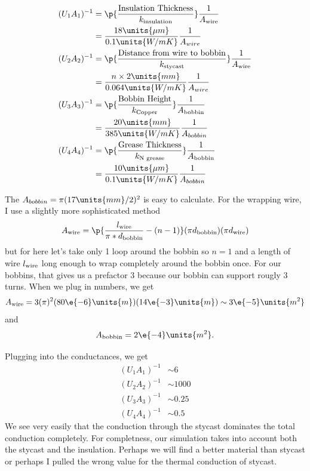 \documentclass[10pt,twocolumn,aps,rmp,tightenlines,reprint]{revtex4-1}
\begin{document}
\begin{align*}
    (U_1A_1)^{-1}
    &= \p{ \frac{\text{Insulation Thickness}}{k_{\text{insulation}}}} 
    \frac{1}{A_{\text{wire}}}\\
    &= \frac{18 \units{\mu m}}{0.1 \units{W/mK}} \frac{1}{A_{wire}}\\
    (U_2A_2)^{-1}
    &= \p{ \frac{\text{Distance from wire to bobbin}}{k_{\text{stycast}}}} 
    \frac{1}{A_{\text{wire}}}\\
    &= \frac{n \times 2 \units{mm}}{0.064 \units{W/mK}} \frac{1}{A_{wire}}\\
    (U_3A_3)^{-1}
    &= \p{ \frac{\text{Bobbin Height}}{k_{\text{Copper}}}} 
    \frac{1}{A_{\text{bobbin}}}\\
    &= \frac{20 \units{mm}}{385 \units{W/mK}} \frac{1}{A_{bobbin}}\\
    (U_4A_4)^{-1}
    &= \p{ \frac{\text{Grease Thickness}}{k_{\text{N grease}}}} 
    \frac{1}{A_{\text{bobbin}}}\\
    &= \frac{10 \units{\mu m}}{0.1 \units{W/mK}} \frac{1}{A_{bobbin}}
\end{align*}

The \(A_{bobbin} = \pi (17\units{mm}/2)^2\) is easy to calculate.  For the 
wrapping wire, I use a slightly more sophisticated method 
\[A_{\rm wire} = \p{\frac{l_{\rm wire}}{\pi * d_{\rm bobbin}} - (n-1)} 
(\pi d_{\rm bobbin}) (\pi d_{\rm wire}) \]
but for here let's take only 1 loop around the bobbin so \(n=1\) and a 
length of wire \(l_{\rm wire}\) long enough to wrap completely around the
bobbin once.  For our bobbins, that gives us a prefactor \(3\) because
our bobbin can support rougly 3 turns.  When we plug in numbers, we get 
\[A_{\rm wire} = 3(\pi)^2(80\e{-6} \units{m})(14\e{-3}\units{m}) 
\sim 3\e{-5} \units{m^2}\]
and 
\[A_{\rm bobbin} = 2\e{-4} \units{m^2}.\]

Plugging into the conductances, we get 
\begin{align*}
    (U_1A_1)^{-1} &\sim 6\\
    (U_2A_2)^{-1} &\sim 1000\\
    (U_3A_3)^{-1} &\sim 0.25\\
    (U_4A_4)^{-1} &\sim 0.5
\end{align*}
We see very easily that the conduction through the stycast dominates 
the total conduction completely.  For completness, our simulation takes 
into account both the stycast and the insulation.  Perhaps we will find a 
better material than stycast or perhaps I pulled the wrong value for the 
thermal conduction of stycast.  
\end{document}
